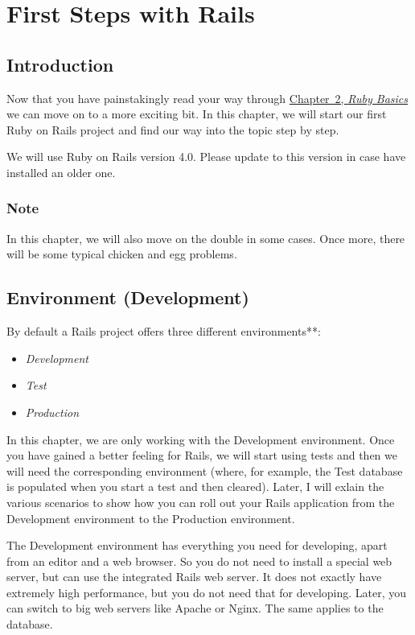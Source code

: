 \documentclass[a4paper]{book}
\newcounter{tab}[chapter]
\newcommand{\chap}[1]{\newpage\thispagestyle{empty}\chapter{#1}\label{chap:\thechapter}}
\begin{document}
\chap{First Steps with Rails}\label{first-steps-with-rails}

\section{Introduction}\label{introduction}

Now that you have painstakingly read your way through \hyperref[ruby-grundlagen]{Chapter~2, \emph{Ruby Basics}} we can move on to a more exciting bit. In this chapter, we will start our first Ruby on Rails project and find our way into the topic step by step.

We will use Ruby on Rails version 4.0. Please update to this version in case have installed an older one.

\subsection{Note}\label{note-12}

In this chapter, we will also move on the double in some cases. Once more, there will be some typical chicken and egg problems.

\section{Environment (Development)}\label{environment-development}

By default a Rails project offers three different environments**:

\begin{itemize}
\itemsep1pt\parskip0pt
\item
  \emph{Development}
\item
  \emph{Test}
\item
  \emph{Production}
\end{itemize}

In this chapter, we are only working with the Development environment. Once you have gained a better feeling for Rails, we will start using tests and then we will need the corresponding environment (where, for example, the Test database is populated when you start a test and then cleared). Later, I will exlain the various scenarios to show how you can roll out your Rails application from the Development environment to the Production environment.

The Development environment has everything you need for developing, apart from an editor and a web browser. So you do not need to install a special web server, but can use the integrated Rails web server. It does not exactly have extremely high performance, but you do not need that for developing. Later, you can switch to big web servers like Apache or Nginx. The same applies to the database.
\end{document}
